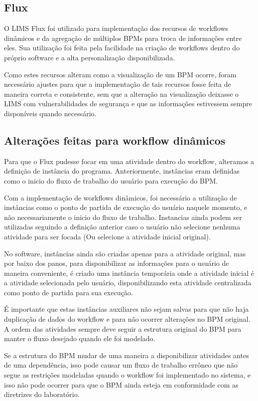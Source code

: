 \subsection{Flux}

O LIMS Flux foi utilizado para implementação dos recursos de workflows dinâmicos e da agregação de múltiplos BPMs para troca de informações entre eles. Sua utilização foi feita pela facilidade na criação de workflows dentro do próprio software e a alta personalização disponibilizada.

Como estes recursos alteram como a visualização de um BPM ocorre, foram necessário ajustes para que a implementação de tais recursos fosse feita de maneira correta e consistente, sem que a alteração na visualização deixasse o LIMS com vulnerabilidades de segurança e que as informações estivessem sempre disponíveis quando necessário.

\subsection{Alterações feitas para workflow dinâmicos}

Para que o Flux pudesse focar em uma atividade dentro do workflow, alteramos a definição de instância do programa. Anteriormente, instâncias eram definidas como o inicio do fluxo de trabalho do usuário para execução do BPM.

Com a implementação de workflows dinâmicos, foi necessário a utilização de instâncias como o ponto de partida de execução do usuário naquele momento, e não necessariamente o inicio do fluxo de trabalho. Instancias ainda podem ser utilizadas seguindo a definição anterior caso o usuário não selecione nenhuma atividade para ser focada (Ou selecione a atividade inicial original).

No software, instâncias ainda são criadas apenas para a atividade original, mas por baixo dos panos, para disponibilizar as informações para o usuário de maneira conveniente, é criado uma instância temporária onde a atividade inicial é a atividade selecionada pelo usuário, disponibilizando esta atividade centralizada como ponto de partida para sua execução.

É importante que estas instâncias auxiliares não sejam salvas para que não haja duplicação de dados do workflow e para não ocorrer alterações no BPM original. A ordem das atividades sempre deve seguir a estrutura original do BPM para manter o fluxo desejado quando ele foi modelado.

Se a estrutura do BPM mudar de uma maneira a disponibilizar atividades antes de uma dependência, isso pode causar um fluxo de trabalho errôneo que não segue as restrições modeladas quando o workflow foi implementado no sistema, e isso não pode ocorrer para que o BPM ainda esteja em conformidade com as diretrizes do laboratório.

